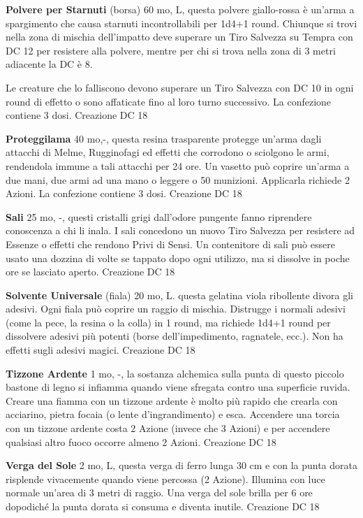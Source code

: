 \documentclass[a4paper,11pt,twoside,openany]{book}
\begin{document}
{\textbf{Polvere per Starnuti} (borsa) 60 mo, L, questa polvere giallo-rossa è un'arma a spargimento che causa starnuti incontrollabili per 1d4+1 round. Chiunque si trovi nella zona di mischia dell'impatto deve superare un Tiro Salvezza su Tempra con DC 12 per resistere alla polvere, mentre per chi si trova nella zona di 3 metri adiacente la DC è 8.

Le creature che lo falliscono devono superare un Tiro Salvezza con DC 10 in ogni round di effetto o sono affaticate fino al loro turno successivo. La confezione contiene 3 dosi. Creazione DC 18

\textbf{Proteggilama} 40 mo,-, questa resina trasparente protegge un'arma dagli attacchi di Melme, Rugginofagi ed effetti che corrodono o sciolgono le armi, rendendola immune a tali attacchi per 24 ore. Un vasetto può coprire un'arma a due mani, due armi ad una mano o leggere o 50 munizioni. Applicarla richiede 2 Azioni. La confezione contiene 3 dosi. Creazione DC 18

\textbf{Sali} 25 mo, -,  questi cristalli grigi dall'odore pungente fanno riprendere conoscenza a chi li inala. I sali concedono un nuovo Tiro Salvezza per resistere ad Essenze o effetti che rendono Privi di Sensi.
Un contenitore di sali può essere usato una dozzina di volte se tappato dopo ogni utilizzo, ma si dissolve in poche ore se lasciato aperto. Creazione DC 18

\textbf{Solvente Universale} (fiala) 20 mo, L. questa gelatina viola ribollente divora gli adesivi. Ogni fiala può coprire un raggio di mischia. Distrugge i normali adesivi (come la pece, la resina o la colla) in 1 round, ma richiede 1d4+1 round per dissolvere adesivi più potenti (borse dell'impedimento, ragnatele, ecc.). Non ha effetti sugli adesivi magici. Creazione DC 18

\textbf{Tizzone Ardente} 1 mo, -, la sostanza alchemica sulla punta di questo piccolo bastone di legno si infiamma quando viene sfregata contro una superficie ruvida. Creare una fiamma con un tizzone ardente è molto più rapido che crearla con acciarino, pietra focaia (o lente d'ingrandimento) e esca. Accendere una torcia con un tizzone ardente costa 2 Azione (invece che 3 Azioni) e per accendere qualsiasi altro fuoco occorre almeno 2 Azioni. Creazione DC 18

\textbf{Verga del Sole} 2 mo, L, questa verga di ferro lunga 30 cm e con la punta dorata risplende vivacemente quando viene percossa (2 Azione). Illumina con luce normale un'area di 3 metri di raggio. Una verga del sole brilla per 6 ore dopodiché la punta dorata si consuma e diventa inutile. Creazione DC 18

}
\end{document}
